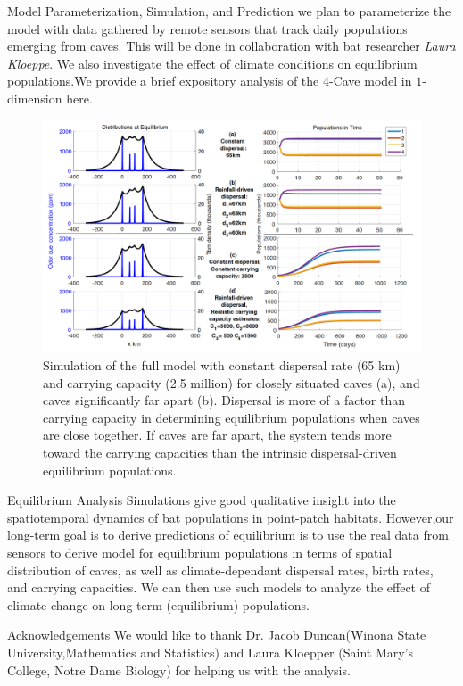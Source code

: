 \documentclass[final]{beamer}
\newlength{\colwidth}
\begin{document}
\begin{frame}[t]
\begin{columns}[t]
\begin{column}{\colwidth}
  \begin{block}{Model Parameterization, Simulation, and Prediction}
we plan to parameterize the model with data gathered by remote sensors that track daily populations emerging from caves.  This will be done in collaboration with bat researcher \textit{Laura Kloeppe}. We also investigate the effect of climate conditions on equilibrium populations.We provide a brief expository analysis of the $4$-Cave model in $1$-dimension here.
 \begin{figure}
 \includegraphics[width = 30cm]{fullmodel.png}
 \caption{Simulation of the full model with constant dispersal rate (65 km) and carrying capacity (2.5
million) for closely situated caves (a), and caves significantly far apart (b). Dispersal is more of a factor than
carrying capacity in determining equilibrium populations when caves are close together. If caves are far
apart, the system tends more toward the carrying capacities than the intrinsic dispersal-driven equilibrium
populations.}
 \end{figure}
  \end{block}
  \begin{block}{Equilibrium Analysis }
    Simulations give good qualitative insight into the spatiotemporal dynamics of bat
 populations in point-patch habitats. However,our long-term goal is to derive predictions of equilibrium is to use the real data from sensors to derive model for equilibrium populations in terms of spatial distribution of caves, as well as climate-dependant dispersal rates, birth rates, and carrying capacities. We can then use such models to analyze the effect of  climate change on long term (equilibrium) populations. 
  \end{block}
  \begin{block}{Acknowledgements}
   We would like to thank Dr. Jacob Duncan(Winona State University,Mathematics and Statistics) and Laura Kloepper (Saint Mary's College, Notre Dame Biology) for helping us with the analysis.
  \end{block}
\end{column}

\end{columns}
\end{frame}
\end{document}
